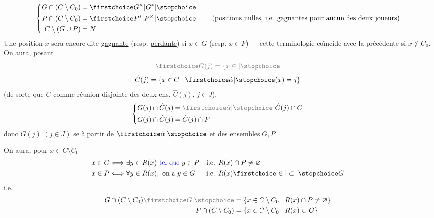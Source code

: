 \[
\left\{\begin{aligned}
G\cap(C\setminus C_0)&=\unsure{G^\times|G^*}\\
P\cap(C\setminus C_0)&=\unsure{P^*|P^\times}\\
C\setminus(G\cup P)&=N
\end{aligned}\right.
\qquad\text{(positions nulles, i.e. gagnantes pour aucun des deux joueurs)}
\]
Une position $x$ sera encore dite \uline{gagnante} (resp. \uline{perdante}) si $x\in G$ (resp. $x\in P$) --- cette terminologie coïncide avec la précédente si $x\notin C_0$. On aura, posant
\[
\deleted{\unsure{G(j)=\{x\in}}
\]
\[
\hat C(j)=\{x\in C\mid\unsure{\hat\alpha}(x)=j\}
\]
(de sorte que $C$  comme réunion disjointe des deux ens. $\hat C(j)$, $j\in J$),
\[
\left\{\begin{aligned}
G(j)\cap\hat C(j)&=\deleted{\unsure{\hat\alpha}}\ \hat C(j)\cap G\\
G(j)\cap\hat C(\bar j)&=\hat C(\bar j)\cap P
\end{aligned}\right.
\]
donc  $G(j)$ $(j\in J)$ se  à partir de $\unsure{\hat\alpha}$ et des ensembles $G,P$.

On aura, pour $x\in C\setminus C_0$
\[
\begin{aligned}
x\in G&\Longleftrightarrow\exists y\in R(x)\ \inserted{\text{tel que}}\ y\in P
&&\text{i.e. }R(x)\cap P\ne\varnothing\\
x\in P&\Longleftrightarrow\forall y\in R(x),\ \text{on a }y\in G
&&\text{i.e. }R(x)\unsure{\in|\subset}G
\end{aligned}
\]
i.e.
\[
\begin{aligned}
G\cap(C\setminus C_0)\deleted{\unsure{G}}&=\{x\in C\setminus C_0\mid R(x)\cap P\ne\varnothing\}\\
P\cap(C\setminus C_0)&=\{x\in C\setminus C_0\mid R(x)\subset G\}
\end{aligned}
\]

